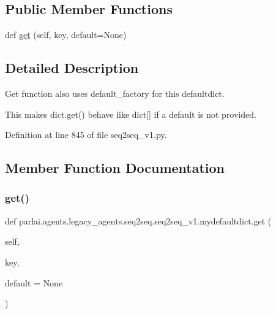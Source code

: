 \subsection*{Public Member Functions}
\begin{DoxyCompactItemize}
\item 
def \hyperlink{classparlai_1_1agents_1_1legacy__agents_1_1seq2seq_1_1seq2seq__v1_1_1mydefaultdict_aa078ac7ad7ce0d11a8aba0834acb4831}{get} (self, key, default=None)
\end{DoxyCompactItemize}


\subsection{Detailed Description}
\begin{DoxyVerb}Get function also uses default_factory for this defaultdict.

This makes dict.get() behave like dict[] if a default is not provided.
\end{DoxyVerb}
 

Definition at line 845 of file seq2seq\+\_\+v1.\+py.



\subsection{Member Function Documentation}
\mbox{\label{classparlai_1_1agents_1_1legacy__agents_1_1seq2seq_1_1seq2seq__v1_1_1mydefaultdict_aa078ac7ad7ce0d11a8aba0834acb4831}} 
\subsubsection{\texorpdfstring{get()}{get()}}
{\footnotesize\ttfamily def parlai.\+agents.\+legacy\+\_\+agents.\+seq2seq.\+seq2seq\+\_\+v1.\+mydefaultdict.\+get (\begin{DoxyParamCaption}\item[{}]{self,  }\item[{}]{key,  }\item[{}]{default = {\ttfamily None} }\end{DoxyParamCaption})}

